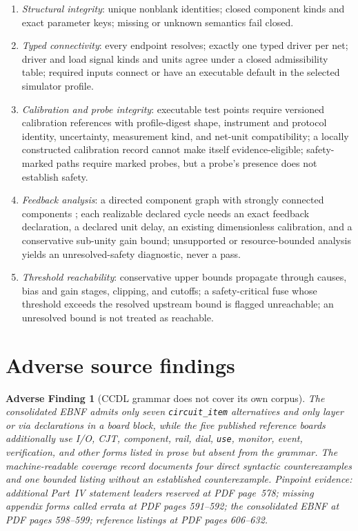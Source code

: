 \documentclass[11pt]{amsart}
\newtheorem{finding}[theorem]{Adverse Finding}
\theoremstyle{definition}
\theoremstyle{remark}
\begin{document}
\begin{enumerate}
\item \emph{Structural integrity}: unique nonblank identities; closed component kinds and exact parameter keys; missing or unknown semantics fail closed.
\item \emph{Typed connectivity}: every endpoint resolves; exactly one typed driver per net; driver and load signal kinds and units agree under a closed admissibility table; required inputs connect or have an executable default in the selected simulator profile.
\item \emph{Calibration and probe integrity}: executable test points require versioned calibration references with profile-digest shape, instrument and protocol identity, uncertainty, measurement kind, and net-unit compatibility; a locally constructed calibration record cannot make itself evidence-eligible; safety-marked paths require marked probes, but a probe's presence does not establish safety.
\item \emph{Feedback analysis}: a directed component graph with strongly connected components \cite{tarjan}; each realizable declared cycle needs an exact feedback declaration, a declared unit delay, an existing dimensionless calibration, and a conservative sub-unity gain bound; unsupported or resource-bounded analysis yields an unresolved-safety diagnostic, never a pass.
\item \emph{Threshold reachability}: conservative upper bounds propagate through causes, bias and gain stages, clipping, and cutoffs; a safety-critical fuse whose threshold exceeds the resolved upstream bound is flagged unreachable; an unresolved bound is not treated as reachable.
\end{enumerate}

\section{Adverse source findings}

\begin{finding}[CCDL grammar does not cover its own corpus]\label{find:grammar}
The consolidated EBNF admits only seven \texttt{circuit\_item} alternatives and only layer or via declarations in a board block, while the five published reference boards additionally use I/O, CJT, component, rail, dial, \texttt{use}, monitor, event, verification, and other forms listed in prose but absent from the grammar. The machine-readable coverage record documents four direct syntactic counterexamples and one bounded listing without an established counterexample. Pinpoint evidence: additional Part~IV statement leaders reserved at PDF page~578; missing appendix forms called errata at PDF pages 591--592; the consolidated EBNF at PDF pages 598--599; reference listings at PDF pages 606--632.
\end{finding}
\end{document}
